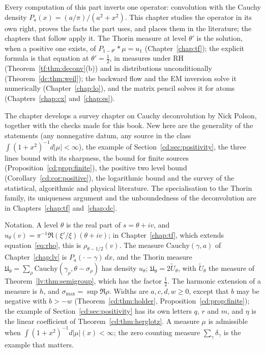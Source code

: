 \label{chap:cd}

Every computation of this part inverts one operator: convolution with the Cauchy density $P_a(x)=(a/\pi)/(a^2+x^2)$. This chapter studies the operator in its own right, proves the facts the part uses, and places them in the literature; the chapters that follow apply it. The Thorin measure at level $\theta'$ is the solution, when a positive one exists, of $P_{1-\theta'}*\mu=u_1$ (Chapter~\ref{chap:tf}); the explicit formula is that equation at $\theta'=\tfrac12$, in measures under RH (Theorem~\ref{tf:thm:deconv}(b)) and in distributions unconditionally (Theorem~\ref{dc:thm:weil}); the backward flow and the EM inversion solve it numerically (Chapter~\ref{chap:lo}), and the matrix pencil solves it for atoms (Chapters~\ref{chap:cx} and~\ref{chap:es}).

The chapter develops a survey chapter on Cauchy deconvolution by Nick Polson, together with the checks made for this book. New here are the generality of the statements (any nonnegative datum, any source in the class $\int(1+x^2)^{-1}d\lvert\mu\rvert<\infty$), the example of Section~\ref{cd:sec:positivity}, the three lines bound with its sharpness, the bound for finite sources (Proposition~\ref{cd:prop:finite}), the positive two level bound (Corollary~\ref{cd:cor:positive}), the logarithmic bound and the survey of the statistical, algorithmic and physical literature. The specialisation to the Thorin family, its uniqueness argument and the unboundedness of the deconvolution are in Chapters~\ref{chap:tf} and~\ref{chap:dc}.

Notation. A level $\theta$ is the real part of $s=\theta+iv$, and $u_\theta(v)=\pi^{-1}\Re(\xi'/\xi)(\theta+iv)$; in Chapter~\ref{chap:tf}, which extends equation~\eqref{eq:rho}, this is $\rho_{\theta-1/2}(v)$. The measure $\mathrm{Cauchy}(\gamma,a)$ of Chapter~\ref{chap:lv} is $P_a(\cdot-\gamma)\,dx$, and the Thorin measure $\mathfrak U_\theta=\sum_\rho\mathrm{Cauchy}(\gamma_\rho,\theta-\sigma_\rho)$ has density $u_\theta$; $\mathfrak U_\theta=2\widetilde U_\theta$, with $\widetilde U_\theta$ the measure of Theorem~\ref{lv:thm:semigroup}, which has the factor $\tfrac12$. The harmonic extension of a measure is $h$, and $\sigma_{\max}=\sup\Re\rho$. Widths are $a,c,d,w\ge0$, except that $b$ may be negative with $b>-w$ (Theorem~\ref{cd:thm:holder}, Proposition~\ref{cd:prop:finite}); the example of Section~\ref{cd:sec:positivity} has its own letters $q$, $r$ and $m$, and $\eta$ is the linear coefficient of Theorem~\ref{cd:thm:herglotz}. A measure $\mu$ is admissible when $\int(1+x^2)^{-1}d\lvert\mu\rvert(x)<\infty$; the zero counting measure $\sum_\gamma\delta_\gamma$ is the example that matters.

